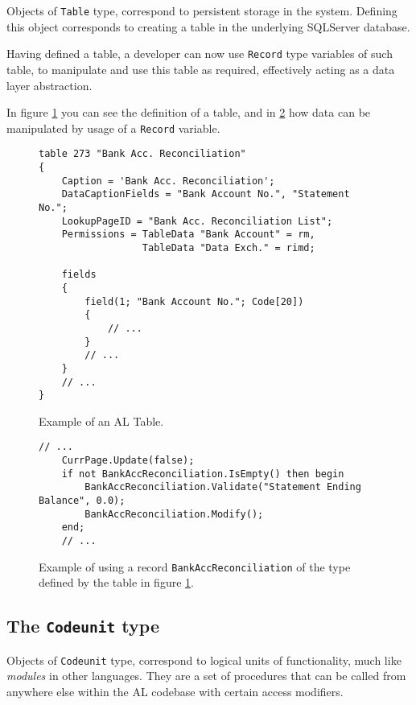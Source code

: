 Objects of \texttt{Table} type, correspond to persistent storage in the system. Defining this object corresponds
to creating a table in the underlying SQLServer database.

Having defined a table, a developer can now use \texttt{Record} type variables of such table,
to manipulate and use this table as required, effectively acting as a data layer abstraction.

In figure \ref{f:app-al-table-alcode} you can see the definition of a table, and in \ref{f:app-al-record-usage}
how data can be manipulated by usage of a \texttt{Record} variable.

\begin{figure}
    \begin{Verbatim}[fontsize=\small]
table 273 "Bank Acc. Reconciliation"
{
    Caption = 'Bank Acc. Reconciliation';
    DataCaptionFields = "Bank Account No.", "Statement No.";
    LookupPageID = "Bank Acc. Reconciliation List";
    Permissions = TableData "Bank Account" = rm,
                  TableData "Data Exch." = rimd;

    fields
    {
        field(1; "Bank Account No."; Code[20])
        {
            // ...
        }
        // ...
    }
    // ...
}
    \end{Verbatim}
    \caption{Example of an AL Table.}
    \label{f:app-al-table-alcode}
\end{figure}

\begin{figure}
    \begin{Verbatim}[fontsize=\small]
    // ...
    CurrPage.Update(false);
    if not BankAccReconciliation.IsEmpty() then begin
        BankAccReconciliation.Validate("Statement Ending Balance", 0.0);
        BankAccReconciliation.Modify();
    end;
    // ...
    \end{Verbatim}
    \caption{Example of using a record \texttt{BankAccReconciliation} of the type defined by the table in figure \ref{f:app-al-table-alcode}.}
    \label{f:app-al-record-usage}
\end{figure}

\subsection{The \texttt{Codeunit} type}

Objects of \texttt{Codeunit} type, correspond to logical units of functionality, much like \emph{modules} in 
other languages. They are a set of procedures that can be called from anywhere else within the AL codebase
with certain access modifiers.

